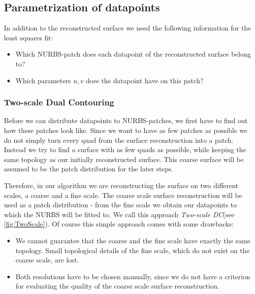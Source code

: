 \subsection{Parametrization of datapoints}
In addition to the reconstructed surface we need the following information for the least squares fit: 
\begin{itemize}
\item Which \ac{NURBS}-patch does each datapoint of the reconstructed surface belong to?
\item Which parameters $u,v$ does the datapoint have on this patch?
\end{itemize}
\subsubsection{Two-scale Dual Contouring }
Before we can distribute datapoints to \ac{NURBS}-patches, we first have to find out how these patches look like. Since we want to have as few patches as possible we do not simply turn every \ac{quad} from the surface reconstruction into a patch. Instead  we try to find a surface with as few \acp{quad} as possible, while keeping the same topology as our initially reconstructed surface. This coarse surface will be assumed to be the patch distribution for the later steps.

Therefore, in our algorithm we are reconstructing the surface on two different scales, a coarse and a fine scale. The coarse scale surface reconstruction will be used as a patch distribution - from the fine scale we obtain our datapoints to which the \ac{NURBS} will be fitted to. We call this approach \emph{Two-scale \acl{DC}}(see \autoref{fig:TwoScale}).
Of course this simple approach comes with some drawbacks:
\begin{itemize}
\item We cannot guarantee that the coarse and the fine scale have exactly the same topology. Small topological details of the fine scale, which do not exist on the coarse scale, are lost.
\item Both resolutions have to be chosen manually, since we do not have a criterion for evaluating the quality of the coarse scale surface reconstruction.
\end{itemize}

